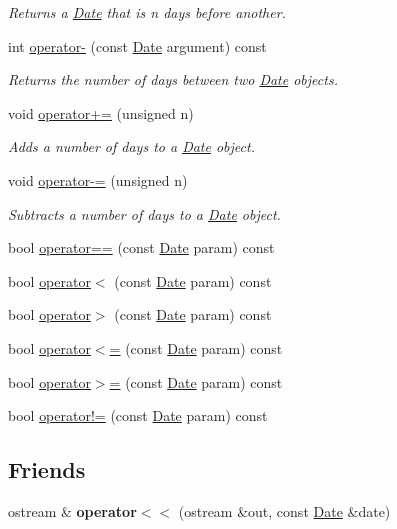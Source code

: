 \begin{DoxyCompactItemize}
\begin{DoxyCompactList}\small\item\em Returns a \hyperlink{classDate}{Date} that is n days before another. \end{DoxyCompactList}\item 
int \hyperlink{classDate_a65012b4e9136060e962de596bcb51017}{operator-\/} (const \hyperlink{classDate}{Date} argument) const
\begin{DoxyCompactList}\small\item\em Returns the number of days between two \hyperlink{classDate}{Date} objects. \end{DoxyCompactList}\item 
void \hyperlink{classDate_a3d72b37493c4e6393b72a5945d405a61}{operator+=} (unsigned n)
\begin{DoxyCompactList}\small\item\em Adds a number of days to a \hyperlink{classDate}{Date} object. \end{DoxyCompactList}\item 
void \hyperlink{classDate_a63f3a52b0561bcfab6f723a0e108f64e}{operator-\/=} (unsigned n)
\begin{DoxyCompactList}\small\item\em Subtracts a number of days to a \hyperlink{classDate}{Date} object. \end{DoxyCompactList}\item 
bool \hyperlink{classDate_a7d37117367e4067ca6ff8acaf5016703}{operator==} (const \hyperlink{classDate}{Date} param) const
\item 
bool \hyperlink{classDate_a931e536af8cdda20dd9f13be4a1b1eaa}{operator$<$} (const \hyperlink{classDate}{Date} param) const
\item 
bool \hyperlink{classDate_a8c20d34bc39224293930711da08c4230}{operator$>$} (const \hyperlink{classDate}{Date} param) const
\item 
bool \hyperlink{classDate_ad4d1bf445fe1fa901f9f64ce7a0761d4}{operator$<$=} (const \hyperlink{classDate}{Date} param) const
\item 
bool \hyperlink{classDate_a8dd74549b9a54b1b91b965cc3bfdcce0}{operator$>$=} (const \hyperlink{classDate}{Date} param) const
\item 
bool \hyperlink{classDate_aca089c2b36cc384dfa7902d64383a193}{operator!=} (const \hyperlink{classDate}{Date} param) const
\end{DoxyCompactItemize}
\subsection*{Friends}
\begin{DoxyCompactItemize}
\item 
\mbox{\label{classDate_a5c29d00ecf33e6d232a410f1f3d6eb70}} 
ostream \& {\bfseries operator$<$$<$} (ostream \&out, const \hyperlink{classDate}{Date} \&date)
\end{DoxyCompactItemize}


